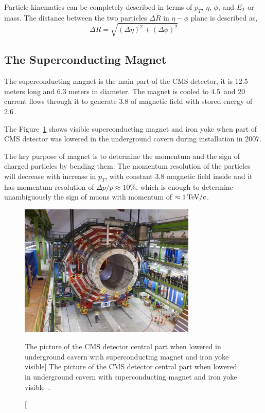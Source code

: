 Particle kinematics can be completely described in terms of
\( p_{T} \), \( \eta \), \( \phi \), and \( E_{T} \) or mass.
The distance between the two particles \( \Delta R \) in \( \eta - \phi \) plane
is described as,
%
\begin{equation}
  \Delta R = \sqrt{ {(\Delta \eta)}^{2} + {(\Delta \phi)}^{2} }
\end{equation}

\subsection{
  The Superconducting Magnet
}

The superconducting magnet is the main part of the \gls{CMS} detector, it is
12.5 meters long and 6.3 meters in diameter. The magnet is cooled to
4.5\,\xspace and 20\,\xspace current flows through it to
generate 3.8\Tesla{} of magnetic field with stored energy of 2.6\,\xspace.

The Figure~\ref{fig:cms-magnet} shows visible superconducting magnet
and iron yoke when part of \gls{CMS} detector was lowered in the underground
cavern during installation in 2007.

The key purpose of magnet is to determine the momentum and the sign of charged
particles by bending them. The momentum resolution of the particles will
decrease with increase in \(p_T \), with constant 3.8\Tesla{} magnetic field
inside and it has momentum resolution of \(\Delta p /p \approx 10 \% \), which
is enough to determine unambiguously the sign of muons with
momentum of \(\approx 1\,\text{Te\hspace{-.08em}V}{}/c \).

\begin{figure}[!ht]
  \centering
  \includegraphics[width=0.75\textwidth]{figures/cms_magnet_lowered.jpg}
  \caption%
  [The picture of the CMS detector central part when lowered in underground
    cavern with superconducting magnet and iron
    yoke visible]%
  {The picture of the CMS detector central part when lowered in underground
    cavern with superconducting magnet and iron
    yoke visible~\cite{image-cms-magnet}.}%
  \label{fig:cms-magnet}
\end{figure}


